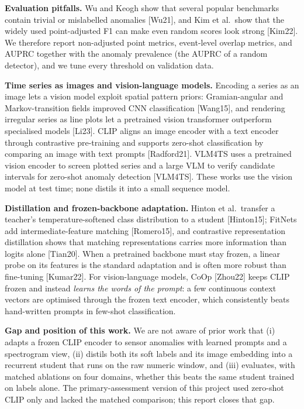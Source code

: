 \documentclass[twoside,english]{article}
\renewcommand{\cite}[1]{[#1]}
\begin{document}
\textbf{Evaluation pitfalls.} Wu and Keogh show that several popular benchmarks contain trivial or mislabelled anomalies \cite{Wu21}, and Kim et al.\ show that the widely used point-adjusted F1 can make even random scores look strong \cite{Kim22}. We therefore report non-adjusted point metrics, event-level overlap metrics, and AUPRC together with the anomaly prevalence (the AUPRC of a random detector), and we tune every threshold on validation data.

\textbf{Time series as images and vision-language models.} Encoding a series as an image lets a vision model exploit spatial pattern priors: Gramian-angular and Markov-transition fields improved CNN classification \cite{Wang15}, and rendering irregular series as line plots let a pretrained vision transformer outperform specialised models \cite{Li23}. CLIP aligns an image encoder with a text encoder through contrastive pre-training and supports zero-shot classification by comparing an image with text prompts \cite{Radford21}. VLM4TS uses a pretrained vision encoder to screen plotted series and a large VLM to verify candidate intervals for zero-shot anomaly detection \cite{VLM4TS}. These works use the vision model at test time; none distils it into a small sequence model.

\textbf{Distillation and frozen-backbone adaptation.} Hinton et al.\ transfer a teacher's temperature-softened class distribution to a student \cite{Hinton15}; FitNets add intermediate-feature matching \cite{Romero15}, and contrastive representation distillation shows that matching representations carries more information than logits alone \cite{Tian20}. When a pretrained backbone must stay frozen, a linear probe on its features is the standard adaptation and is often more robust than fine-tuning \cite{Kumar22}. For vision-language models, CoOp \cite{Zhou22} keeps CLIP frozen and instead \emph{learns the words of the prompt}: a few continuous context vectors are optimised through the frozen text encoder, which consistently beats hand-written prompts in few-shot classification.

\textbf{Gap and position of this work.} We are not aware of prior work that (i) adapts a frozen CLIP encoder to sensor anomalies with learned prompts and a spectrogram view, (ii) distils both its soft labels and its image embedding into a recurrent student that runs on the raw numeric window, and (iii) evaluates, with matched ablations on four domains, whether this beats the same student trained on labels alone. The primary-assessment version of this project used zero-shot CLIP only and lacked the matched comparison; this report closes that gap.
\end{document}

